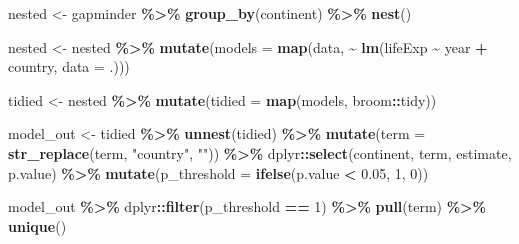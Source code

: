 \documentclass[
]{book}
\newenvironment{Shaded}{\begin{snugshade}}{\end{snugshade}}
\newcommand{\AttributeTok}[1]{\textcolor[rgb]{0.13,0.29,0.53}{#1}}
\newcommand{\DecValTok}[1]{\textcolor[rgb]{0.00,0.00,0.81}{#1}}
\newcommand{\FloatTok}[1]{\textcolor[rgb]{0.00,0.00,0.81}{#1}}
\newcommand{\FunctionTok}[1]{\textcolor[rgb]{0.13,0.29,0.53}{\textbf{#1}}}
\newcommand{\NormalTok}[1]{#1}
\newcommand{\OtherTok}[1]{\textcolor[rgb]{0.56,0.35,0.01}{#1}}
\newcommand{\SpecialCharTok}[1]{\textcolor[rgb]{0.81,0.36,0.00}{\textbf{#1}}}
\newcommand{\StringTok}[1]{\textcolor[rgb]{0.31,0.60,0.02}{#1}}
\begin{document}
\begin{Shaded}
\begin{Highlighting}[]
\NormalTok{nested }\OtherTok{\textless{}{-}}\NormalTok{ gapminder }\SpecialCharTok{\%\textgreater{}\%}
  \FunctionTok{group\_by}\NormalTok{(continent) }\SpecialCharTok{\%\textgreater{}\%}
  \FunctionTok{nest}\NormalTok{()}

\NormalTok{nested }\OtherTok{\textless{}{-}}\NormalTok{ nested }\SpecialCharTok{\%\textgreater{}\%}
  \FunctionTok{mutate}\NormalTok{(}\AttributeTok{models =} \FunctionTok{map}\NormalTok{(data, }\SpecialCharTok{\textasciitilde{}} \FunctionTok{lm}\NormalTok{(lifeExp }\SpecialCharTok{\textasciitilde{}}\NormalTok{ year }\SpecialCharTok{+}\NormalTok{ country, }\AttributeTok{data =}\NormalTok{ .)))}

\NormalTok{tidied }\OtherTok{\textless{}{-}}\NormalTok{ nested }\SpecialCharTok{\%\textgreater{}\%}
  \FunctionTok{mutate}\NormalTok{(}\AttributeTok{tidied =} \FunctionTok{map}\NormalTok{(models, broom}\SpecialCharTok{::}\NormalTok{tidy))}

\NormalTok{model\_out }\OtherTok{\textless{}{-}}\NormalTok{ tidied }\SpecialCharTok{\%\textgreater{}\%}
  \FunctionTok{unnest}\NormalTok{(tidied) }\SpecialCharTok{\%\textgreater{}\%}
  \FunctionTok{mutate}\NormalTok{(}\AttributeTok{term =} \FunctionTok{str\_replace}\NormalTok{(term, }\StringTok{"country"}\NormalTok{, }\StringTok{""}\NormalTok{)) }\SpecialCharTok{\%\textgreater{}\%}
\NormalTok{  dplyr}\SpecialCharTok{::}\FunctionTok{select}\NormalTok{(continent, term, estimate, p.value) }\SpecialCharTok{\%\textgreater{}\%}
  \FunctionTok{mutate}\NormalTok{(}\AttributeTok{p\_threshold =} \FunctionTok{ifelse}\NormalTok{(p.value }\SpecialCharTok{\textless{}} \FloatTok{0.05}\NormalTok{, }\DecValTok{1}\NormalTok{, }\DecValTok{0}\NormalTok{))}

\NormalTok{model\_out }\SpecialCharTok{\%\textgreater{}\%}
\NormalTok{  dplyr}\SpecialCharTok{::}\FunctionTok{filter}\NormalTok{(p\_threshold }\SpecialCharTok{==} \DecValTok{1}\NormalTok{) }\SpecialCharTok{\%\textgreater{}\%}
  \FunctionTok{pull}\NormalTok{(term) }\SpecialCharTok{\%\textgreater{}\%}
  \FunctionTok{unique}\NormalTok{()}
\end{Highlighting}
\end{Shaded}
\end{document}
